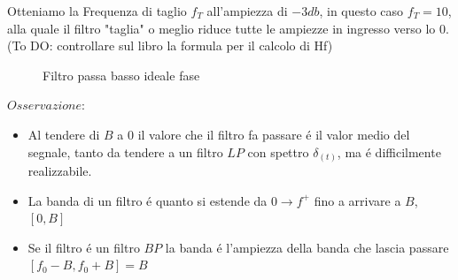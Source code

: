             Otteniamo la Frequenza di taglio $f_T$ all'ampiezza di $-3db$, in questo caso $f_T = 10$, alla quale
            il filtro "taglia" o meglio riduce tutte le ampiezze in ingresso verso lo 0.
            (To DO: controllare sul libro la formula per il calcolo di Hf)
            \begin{figure}[H]
                \centering
                \caption{Filtro passa basso ideale fase}
                \label{fig:LP filter phase}
            \end{figure} 

            $Osservazione$: 
            \begin{itemize}
                \item{
                    Al tendere di $B$ a $0$ il valore che il filtro fa passare é il valor medio del segnale, tanto da tendere
                    a un filtro $LP$ con spettro $\delta_{(t)}$, ma é difficilmente realizzabile.
                }
                \item{
                    La banda di un filtro é quanto si estende da $0 \rightarrow f^+$ fino a arrivare a $B$,$[0,B]$
                }
                \item{
                    Se il filtro é un filtro $BP$ la banda é l'ampiezza della banda che lascia passare $[f_0-B,f_0+B] = B$
                }
            \end{itemize}
